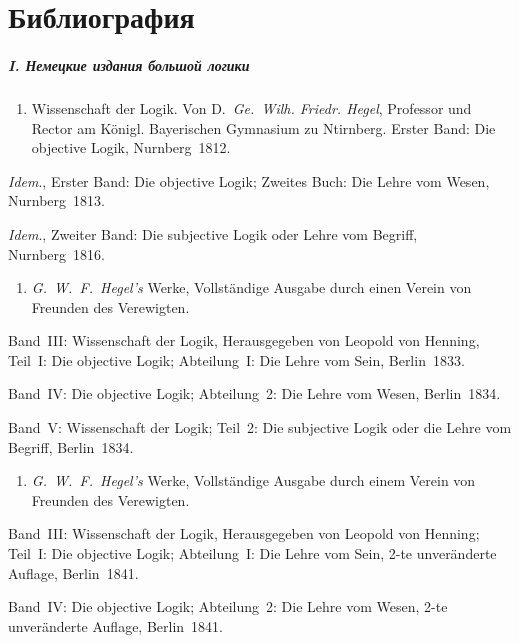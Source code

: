 \bigskip

\clearpage
\chapter[Библиография]{Библиография}
\paragraph[I. Немецкие издания большой логики]
{I. Немецкие издания большой логики}

\begin{enumerate}
\item
Wissenschaft der Logik. Von D.~{\em Ge.~Wilh. Friedr. Hegel},
Professor und Rector am Königl. Bayerischen Gymnasium zu Ntirnberg.
Erster Band: Die objective Logik, Nurnberg~1812.
\end{enumerate}

{\em Idem}., Erster Band: Die objective Logik; Zweites Buch: Die Lehre
vom Wesen, Nurnberg~1813.

{\em Idem}., Zweiter Band: Die subjective Logik oder Lehre vom Begriff,
Nurnberg~1816.

\begin{enumerate}
\item
{\em G.~W.~F.~Hegel's} Werke, Vollständige Ausgabe durch einen Verein von
Freunden des Verewigten.
\end{enumerate}

Band~III: Wissenschaft der Logik, Herausgegeben von
Leopold von Henning, Teil~I: Die objective Logik; Abteilung~I: Die Lehre
vom Sein, Berlin~1833.

Band~IV: Die objective Logik; Abteilung~2: Die Lehre vom Wesen, Berlin~1834.

Band~V: Wissenschaft der Logik; Teil~2: Die subjective Logik oder die Lehre
vom Begriff, Berlin~1834.

\begin{enumerate}
\item
{\em G.~W.~F.~Hegel's} Werke, Vollständige Ausgabe durch einem Verein von
Freunden des Verewigten.
\end{enumerate}

Band~III: Wissenschaft der Logik, Herausgegeben von Leopold von Henning;
Teil~I: Die objective Logik; Abteilung~I: Die Lehre vom Sein, 2-te
unveränderte Auflage, Berlin~1841.

Band~IV: Die objective Logik; Abteilung~2: Die Lehre vom Wesen, 2-te
unveränderte Auflage, Berlin~1841.

